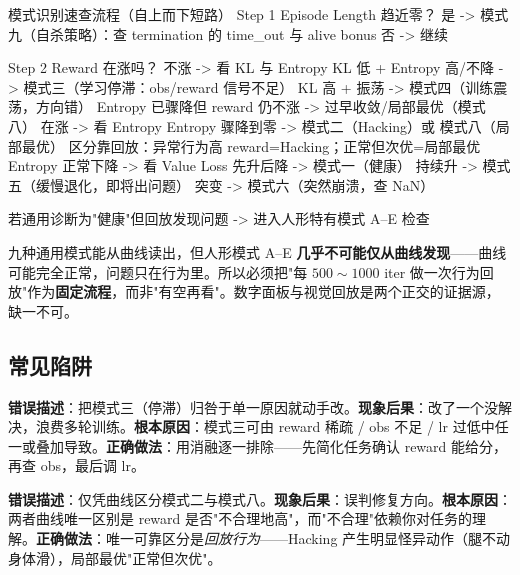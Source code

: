 \begin{codebox}[text]{模式识别速查流程（自上而下短路）}
Step 1  Episode Length 趋近零？
        是 -> 模式九（自杀策略）：查 termination 的 time_out 与 alive bonus
        否 -> 继续

Step 2  Reward 在涨吗？
        不涨 -> 看 KL 与 Entropy
                KL 低 + Entropy 高/不降 -> 模式三（学习停滞：obs/reward 信号不足）
                KL 高 + 振荡            -> 模式四（训练震荡，方向错）
                Entropy 已骤降但 reward 仍不涨 -> 过早收敛/局部最优（模式八）
        在涨 -> 看 Entropy
                Entropy 骤降到零 -> 模式二（Hacking）或 模式八（局部最优）
                                   区分靠回放：异常行为高 reward=Hacking；正常但次优=局部最优
                Entropy 正常下降 -> 看 Value Loss
                                   先升后降 -> 模式一（健康）
                                   持续升   -> 模式五（缓慢退化，即将出问题）
                                   突变     -> 模式六（突然崩溃，查 NaN）

若通用诊断为"健康"但回放发现问题 -> 进入人形特有模式 A--E 检查
\end{codebox}

\begin{insight}\label{ins:rlmc-diag-replay}
九种通用模式能从曲线读出，但人形模式 A--E \textbf{几乎不可能仅从曲线发现}——曲线可能完全正常，问题只在行为里。所以必须把"每 $500\sim1000$ iter 做一次行为回放"作为\textbf{固定流程}，而非"有空再看"。数字面板与视觉回放是两个正交的证据源，缺一不可。
\end{insight}

\subsection{常见陷阱}

\begin{pitfall}[一个模式只有一个原因]
\textbf{错误描述}：把模式三（停滞）归咎于单一原因就动手改。\textbf{现象后果}：改了一个没解决，浪费多轮训练。\textbf{根本原因}：模式三可由 reward 稀疏 / obs 不足 / lr 过低中任一或叠加导致。\textbf{正确做法}：用消融逐一排除——先简化任务确认 reward 能给分，再查 obs，最后调 lr。
\end{pitfall}

\begin{pitfall}
\textbf{错误描述}：仅凭曲线区分模式二与模式八。\textbf{现象后果}：误判修复方向。\textbf{根本原因}：两者曲线唯一区别是 reward 是否"不合理地高"，而"不合理"依赖你对任务的理解。\textbf{正确做法}：唯一可靠区分是\emph{回放行为}——Hacking 产生明显怪异动作（腿不动身体滑），局部最优"正常但次优"。
\end{pitfall}

